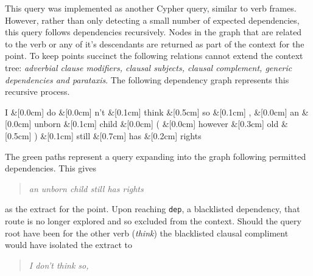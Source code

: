     This query was implemented as another Cypher query, similar to verb frames. However, rather than only detecting a small number of expected dependencies, this query follows dependencies recursively. Nodes in the graph that are related to the verb or any of it's descendants are returned as part of the context for the point. To keep points succinct the following relations cannot extend the context tree: \textit{adverbial clause modifiers, clausal subjects, clausal complement, generic dependencies and parataxis}. The following dependency graph represents this recursive process.

    \begin{center}
      \begin{dependency}[edge horizontal padding=0]
        \begin{deptext}
          I \&[0.0cm] do \&[0.0cm] n't \&[0.1cm] think \&[0.5cm] so \&[0.1cm] , \&[0.0cm] an \&[0.0cm] unborn \&[0.1cm] child \&[0.0cm] ( \&[0.0cm] however \&[0.3cm] old \&[0.5cm] ) \&[0.1cm] still \&[0.7cm] has \&[0.2cm] rights \\
        \end{deptext}





      \end{dependency}
    \end{center}

    The green paths represent a query expanding into the graph following permitted dependencies. This gives \blockquote{\textit{an unborn child still has rights}} as the extract for the point. Upon reaching \texttt{dep}, a blacklisted dependency, that route is no longer explored and so excluded from the context. Should the query root have been for the other verb (\textit{think}) the blacklisted clausal compliment would have isolated the extract to \blockquote{\textit{I don't think so,}}.

